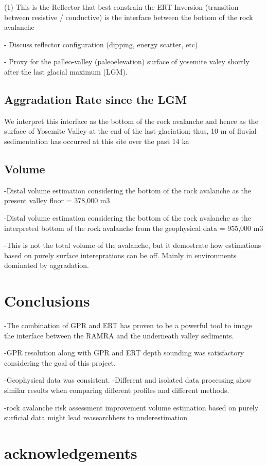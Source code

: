 \documentclass[5p]{elsarticle}
\begin{document}
	(1) This is the Reflector that best constrain the ERT Inversion (transition between resistive / 	conductive) is the interface between the bottom of the rock avalanche


- Discuss reflector configuration (dipping, energy scatter, etc) 


- Proxy for the palleo-valley (paleoelevation)  surface of yosemite valey shortly after the last glacial maximum (LGM).



\subsection{Aggradation Rate since the LGM}

We interpret this interface as the bottom of the rock avalanche and hence as the surface of Yosemite Valley at the end of the last glaciation; thus,   10 m of fluvial sedimentation has occurred at this site over the past 14 ka




\subsection{Volume}

-Distal volume estimation considering the bottom of the rock avalanche as the present valley floor =  378,000 m3

-Distal volume estimation considering the bottom of the rock avalanche as the interpreted bottom of the rock avalanche from the geophysical data = 955,000 m3 

-This is not the total volume of the avalanche, but it demostrate how estimations based on purely surface intereprations can be off. Mainly in environments dominated by aggradation. 





\section{Conclusions}

-The combination of GPR and ERT has proven to be a powerful tool to image the interface between the RAMRA and the underneath valley sediments. 


-GPR resolution along with GPR and ERT depth sounding was satisfactory considering the goal of this project. 

-Geophysical data was consistent.
	-Different and isolated data processing show similar results when comparing different profiles and different methods. 


-rock avalanche risk assessment improvement 
	volume estimation based on purely surficial data might lead reasearchhers to underestimation


\section{acknowledgements}







\end{document}
